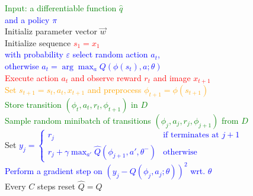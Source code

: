 \documentclass{standalone}
\begin{document}
\pagestyle{empty}
\begin{algorithm}[H]
  \textcolor{Green}{Input: a differentiable function $\hat{q}$}\\
  \textcolor{blue}{and a policy $\pi$}\\
  \textcolor{Cerulean}{Initializ parameter vector $\vec{w}$} \\
 {
  Initialize sequence \textcolor{red}{$s_1 = {x_1}$}\\
   {
  \textcolor{blue}{with probability $\varepsilon$ select random action $a_t$, \\
  	otherwise $a_t = \arg\max_{a} Q(\phi(s_t), a; \theta)$} \\
  \textcolor{red}{Execute action $a_t$ and observe reward $r_t$ and image $x_{t+1}$}\\
  \textcolor{orange}{Set $s_{t+1} = s_t, a_t, x_{t+1}$ and preprocess $\phi_{t+1} = \phi(s_{t+1})$}\\
  \textcolor{Green}{Store transition $(\phi_t,a_t ,r_t, \phi_{t+1})$ in $D$\\
  Sample random minibatch of transitions $(\phi_j,a_j ,r_j, \phi_{j+1})$ from $D$}\\
  Set \textcolor{blue}{$y_j = \begin{cases}
      r_j & \text{if terminates at } j+1\\
      r_j + \gamma \max_{a'} \hat{Q}(\phi_{j+1}, a', \theta^{-}) & \text{otherwise}
    \end{cases} $} \\
  \textcolor{blue}{Perform a gradient step on $(y_j - Q(\phi_j, a_j; \theta))^2$ wrt. $\theta$}\\
  \textcolor{Cerulean}{Every $C$ steps reset $\hat{Q} = Q$}
  }
}
\end{algorithm}
\end{document}
